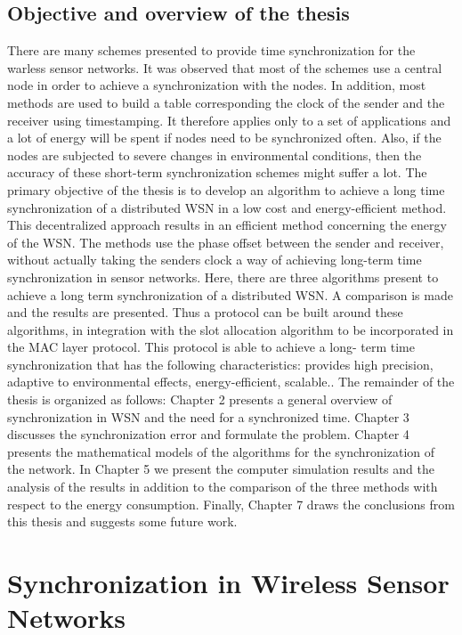 \documentclass[a4paper,8pt]{report}
\begin{document}
\section{Objective and overview of the thesis}
      There are many schemes presented to provide time synchronization
for the warless sensor networks. It was observed that most of the
schemes use a central node in order to achieve a synchronization
with the nodes. In addition, most methods are used to build a table
corresponding the clock of the sender and the receiver using
timestamping. It therefore applies only to a set of applications and
a lot of energy will be spent if nodes need to be synchronized
often. Also, if the nodes are subjected to severe changes in
environmental conditions, then the accuracy of these short-term
synchronization schemes might suffer a lot.
\newline
The primary objective of the thesis is to develop an algorithm to
achieve a long time synchronization of a distributed WSN in a low
cost and energy-efficient method. This decentralized approach
results in an efficient method concerning the energy of the WSN. The
methods use the phase offset between the sender and receiver,
without actually taking the senders clock a way of achieving
long-term time synchronization in sensor networks. Here, there are
three algorithms present to achieve a long term synchronization of a
distributed WSN. A comparison is made and the results are presented.
Thus a protocol can be built around these algorithms, in integration
with the slot allocation algorithm to be incorporated in the MAC
layer protocol. This protocol is able to achieve a long- term time
synchronization that has the following characteristics: provides
high precision, adaptive to environmental effects, energy-efficient,
scalable..
\newline The remainder of the thesis is organized as follows:  Chapter 2
presents a general overview of synchronization in WSN and the need
for a synchronized time. Chapter 3 discusses the synchronization
error and formulate the problem. Chapter 4 presents the mathematical
models of the algorithms for the synchronization of the network. In
Chapter 5 we present the computer simulation results and the
analysis of the results in addition to the comparison of the three
methods with respect to the energy consumption. Finally, Chapter 7
draws the conclusions from this thesis and suggests some future
work.
\newpage
\chapter{Synchronization in Wireless Sensor Networks}
\end{document}

